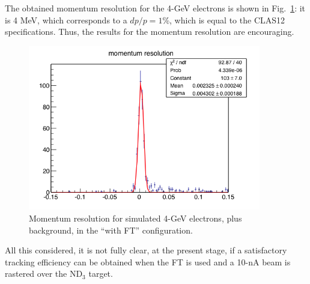 The obtained momentum resolution for the 4-GeV electrons is shown in Fig.~\ref{mom_res}: it is 4 MeV, which corresponds to a $dp/p=1$\%, which is equal to the CLAS12 specifications. Thus, the results for the momentum resolution are encouraging. 
\begin{figure}[htbp] 
   \centering
   \includegraphics[width=4in]{mom_res_raster.png} 
   \caption{Momentum resolution for simulated 4-GeV electrons, plus background, in the ``with FT'' configuration. }
   \label{mom_res}
\end{figure}
All this considered, it is not fully clear, at the present stage, if a satisfactory tracking efficiency can be obtained when the FT is used and a 10-nA beam is rastered over the ND$_3$ target. %
